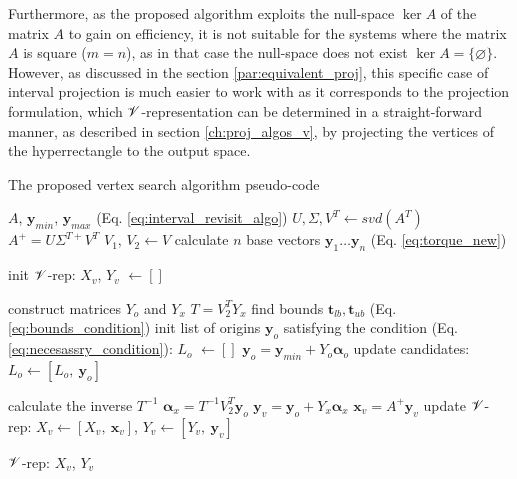 Furthermore, as the proposed algorithm exploits the null-space $\ker{A}$ of the matrix $A$ to gain on efficiency, it is not suitable for the systems where the matrix $A$ is square ($m\!=\!n$), as in that case the null-space does not exist $\ker{A}=\{\varnothing\}$. However, as discussed in the section \ref{par:equivalent_proj}, this specific case of interval projection is much easier to work with as it corresponds to the projection formulation, which $\mathscr{V}$-representation can be determined in a straight-forward manner, as described in section \ref{ch:proj_algos_v}, by projecting the vertices of the hyperrectangle to the output space.


\begin{algorithm}[!h]
\caption{The proposed vertex search algorithm pseudo-code}
\begin{algorithmic}
\REQUIRE $A$, $\bm{y}_{min}$, $\bm{y}_{max}$ (Eq. \ref{eq:interval_revisit_algo}) 
\STATE $U, \Sigma, V^T \leftarrow svd(A^T)$ 
\STATE $A^{+} = U\Sigma^{T+}V^T$
\STATE $V_1,\, V_2  \leftarrow V $
\STATE calculate $n$ base vectors $\bm{y}_1 \dotsc \bm{y}_n$ (Eq. \ref{eq:torque_new})

\STATE init $\mathscr{V}$-rep: $X_v$, $Y_v$ $\!\leftarrow\! []$

\STATE construct matrices $Y_o$ and $Y_x$
\STATE $T = V_2^TY_x$
\STATE find bounds $\bm{t}_{lb},\bm{t}_{ub}$ (Eq. \ref{eq:bounds_condition})
\STATE init list of origins $\bm{y}_o$ satisfying the condition (Eq. \ref{eq:necesassry_condition}): $L_o$ $\!\leftarrow\! []$ 
\STATE $\bm{y}_o = \bm{y}_{min} +  Y_o\bm{\alpha}_o$ 
\STATE update candidates: $L_o \!\leftarrow\! [L_o,~ \bm{y}_o]$
\ENDIF
\ENDFOR

\STATE calculate the inverse $T^{-1}$
\STATE $\bm{\alpha}_x = T^{-1}V_2^T\bm{y}_o $
\STATE $\bm{y}_{v} = \bm{y}_o + Y_x\bm{\alpha}_x$ 
\STATE $\bm{x}_{v} = A^{+}\bm{y}_{v}$ 
\STATE update $\mathscr{V}$-rep: ${X}_{v} \!\leftarrow\! [{X}_{v},~ \bm{x}_v ]$, ${Y}_{v} \!\leftarrow\! [{Y}_{v},~ \bm{y}_v ]$ 
\ENDIF
\ENDFOR
\ENDIF


\ENDIF

\ENDFOR
\RETURN $\mathscr{V}$-rep: $X_v$, $Y_v$

\end{algorithmic}
\label{alg:algo_1}
\end{algorithm}

